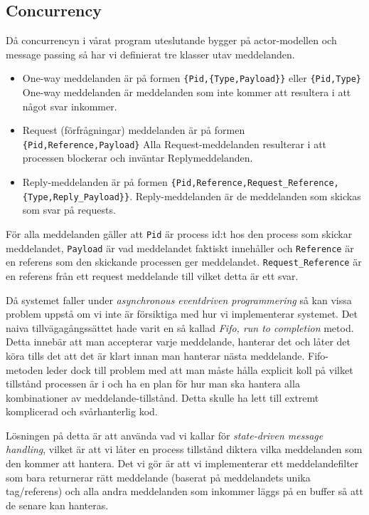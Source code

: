 \documentclass[12pt]{article}
\begin{document}
\subsection{Concurrency}
Då concurrencyn i vårat program uteslutande bygger på actor-modellen och message passing så har vi definierat tre klasser utav meddelanden.
\begin{itemize}
    \item One-way meddelanden är på formen \texttt{\{Pid,\{Type,Payload\}\}} eller \texttt{\{Pid,Type\}} One-way meddelanden är meddelanden som inte kommer att resultera i att något svar inkommer.
    \item Request (förfrågningar) meddelanden är på formen \texttt{\{Pid,Reference,Payload\}} Alla Request-meddelanden resulterar i att processen blockerar och inväntar Replymeddelanden.
    \item Reply-meddelanden är på formen \texttt{\{Pid,Reference,Request\_Reference,\{Type,Reply\_Payload\}\}}.
    Reply-meddelanden är de meddelanden som skickas som svar på requests.
\end{itemize}

För alla meddelanden gäller att \texttt{Pid} är process id:t hos den process som skickar meddelandet,
\texttt{Payload} är vad meddelandet faktiskt innehåller och \texttt{Reference} är en referens som den skickande processen ger meddelandet.
\texttt{Request\_Reference} är en referens från ett
request meddelande till vilket detta är ett svar.

Då systemet faller under \textit{asynchronous eventdriven programmering} så kan vissa problem uppstå om vi inte är försiktiga med hur vi implementerar systemet.
Det naiva tillvägagångssättet hade varit en så kallad \textit{Fifo,
run to completion} metod.
Detta innebär att man accepterar varje meddelande,
hanterar det och låter det köra tills det att det är klart innan man hanterar nästa meddelande.
Fifo-metoden leder dock till problem med att man måste hålla explicit koll på vilket tillstånd processen är i och ha en plan för hur man ska hantera alla kombinationer av meddelande-tillstånd.
Detta skulle ha lett till extremt komplicerad och svårhanterlig kod.~\cite{wiger-complexity}

Lösningen på detta är att använda vad vi kallar för \textit{state-driven message handling},
vilket är att vi låter en process tillstånd diktera vilka meddelanden som den kommer att hantera.
Det vi gör är att vi implementerar ett meddelandefilter som bara returnerar rätt meddelande (baserat på meddelandets unika tag/referens) och alla andra meddelanden som inkommer läggs på en buffer så att de senare kan hanteras.
\end{document}
